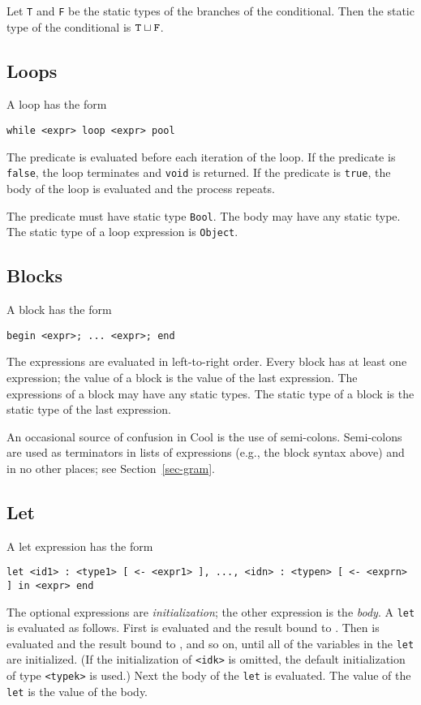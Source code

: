 Let {\tt T} and {\tt F} be the static types of the branches of the conditional.
Then the static type of the conditional is $\tt T \sqcup F$.

\subsection{Loops}
A loop has the form
\begin{verbatim}
while <expr> loop <expr> pool
\end{verbatim}
The predicate is evaluated before each iteration of the loop.
If the predicate is {\tt false}, the loop terminates and {\tt void}
is returned.  If the predicate is {\tt true},
the body of the loop is evaluated and the process repeats.

The predicate must have static type {\tt Bool}.  The body may have any
static type.  The static type of a loop expression is {\tt Object}.

\subsection{Blocks}
A block has the form
\begin{verbatim}
begin <expr>; ... <expr>; end
\end{verbatim}
The expressions are evaluated in left-to-right order.  Every block has
at least one expression; the value of a block is the value of the last
expression.  The expressions of a block may have any static types.
The static type of a block is the static type of the last expression.

An occasional source of confusion in Cool is the use of semi-colons.
Semi-colons are used as terminators in lists of expressions
(e.g., the block syntax above) and in no other places; see Section~\ref{sec-gram}.

\subsection{Let}
A let expression has the form
\begin{verbatim}
let <id1> : <type1> [ <- <expr1> ], ..., <idn> : <typen> [ <- <exprn> ] in <expr> end
\end{verbatim}

The optional expressions are {\em initialization}; the other
expression is the {\em body}.
A {\tt let} is evaluated as follows.
First {\tt <expr1>} is evaluated and the result bound to {\tt <id1>}.
Then {\tt <expr2>} is evaluated and the result bound to {\tt <id2>},
and so on, until all of the variables in the
{\tt let} are initialized.  (If the initialization of {\tt <idk>} is
omitted, the default initialization of type {\tt <typek>} is used.)
Next the body of the {\tt let} is evaluated.
The value of the {\tt let} is the value of the body.

